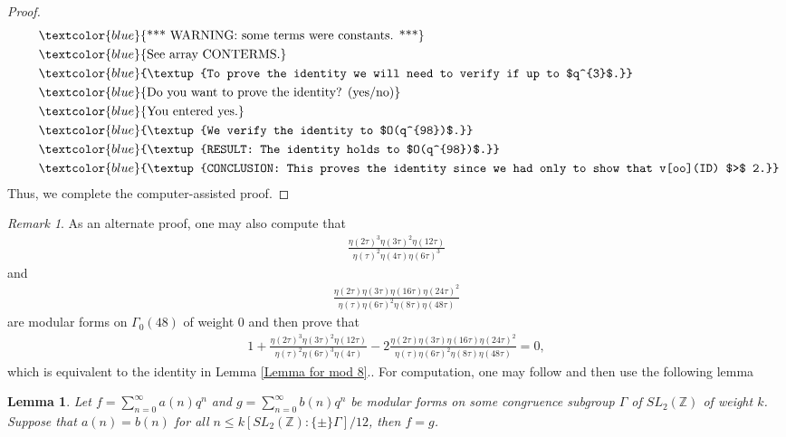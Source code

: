 \documentclass[12pt]{article}
\numberwithin{equation}{section}
\theoremstyle{plain}
\numberwithin{theorem}{section}
\newtheorem{lemma}[theorem]{Lemma}
\theoremstyle{definition}
\theoremstyle{remark}
\newtheorem*{remark}{Remark}
\begin{document}
\begin{proof}
\begin{align*}
    &\quad \quad \textcolor{blue}{\textup{*** WARNING: some terms were constants. ***}}\\
    &\quad \quad \textcolor{blue}{\textup{See array CONTERMS.}}\\
    &\quad \quad \textcolor{blue}{\textup{To prove the identity we will need to verify if up to $q^{3}$.}}\\
    &\quad \quad \textcolor{blue}{\textup{Do you want to prove the identity? (yes/no)}}\\
    &\quad \quad \textcolor{blue}{\textup{You entered yes.}}\\
    &\quad \quad \textcolor{blue}{\textup{We verify the identity to $O(q^{98})$.}}\\
    &\quad \quad \textcolor{blue}{\textup{RESULT: The identity holds to $O(q^{98})$.}}\\
     &\quad \quad \textcolor{blue}{\textup{CONCLUSION: This proves the identity since we had only to show that v[oo](ID) $>$ 2.}}
\end{align*}
Thus, we complete the computer-assisted proof.
\end{proof}
\begin{remark}
    As an alternate proof, one may also compute that
    \begin{align*}
        \displaystyle{\frac{\eta \! \left(2 \tau \right)^{3} \eta \! \left(3 \tau \right)^{2} \eta \! \left(12 \tau \right)}{\eta \! \left(\tau \right)^{2} \eta \! \left(4 \tau \right) \eta \! \left(6 \tau \right)^{3}}}
    \end{align*}
    and 
    \begin{align*}
        \displaystyle{ \frac{\eta \! \left(2 \tau \right) \eta \! \left(3 \tau \right) \eta \! \left(16 \tau \right) \eta \! \left(24 \tau \right)^{2}}{\eta \! \left(\tau \right) \eta \! \left(6 \tau \right)^{2} \eta \! \left(8 \tau \right) \eta \! \left(48 \tau \right)}}
    \end{align*}
    are modular forms on $\Gamma_0(48)$ of weight 0 and then prove that
    \begin{align*}
        1+\frac{\eta \! \left(2 \tau \right)^{3} \eta \! \left(3 \tau \right)^{2} \eta \! \left(12 \tau \right)}{\eta \! \left(\tau \right)^{2} \eta \! \left(6 \tau \right)^{3} \eta \! \left(4 \tau \right)}-2\frac{ \eta \! \left(2 \tau \right) \eta \! \left(3 \tau \right) \eta \! \left(16 \tau \right) \eta \! \left(24 \tau \right)^{2}}{\eta \! \left(\tau \right) \eta \! \left(6 \tau \right)^{2} \eta \! \left(8 \tau \right) \eta \! \left(48 \tau \right)}=0,
    \end{align*} 
    which is equivalent to the identity in Lemma \ref{Lemma for mod 8}.. For computation, one may follow \cite[Theorems 1.64 and 1.65]{Ono04} and then use the following lemma
    \begin{lemma}\cite{MDG15}
        Let $f=\displaystyle{\sum_{n=0}^\infty a(n)q^n}$ and $g=\displaystyle{\sum_{n=0}^\infty b(n)q^n}$ be modular forms on some congruence subgroup $\Gamma$ of $SL_2(\mathbb{Z})$ of weight $k$. Suppose that $a(n)=b(n)$ for all $n\le k [SL_2(\mathbb{Z}):\{\pm\}\Gamma]/12$, then $f=g$.
    \end{lemma}
\end{remark}
\end{document}
